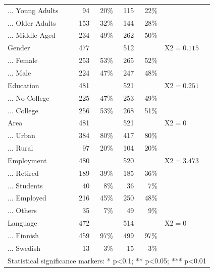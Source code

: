 \begin{table}[!htbp]
\begin{tabular}{lrrrrl}
... Young Adults & 94 & 20\% & 115 & 22\% &  \\ 
... Older Adults & 153 & 32\% & 144 & 28\% &  \\ 
... Middle-Aged & 234 & 49\% & 262 & 50\% &  \\ 
Gender & 477 &  & 512 &  & X2$=0.115$ \\ 
... Female & 253 & 53\% & 265 & 52\% &  \\ 
... Male & 224 & 47\% & 247 & 48\% &  \\ 
Education & 481 &  & 521 &  & X2$=0.251$ \\ 
... No College & 225 & 47\% & 253 & 49\% &  \\ 
... College & 256 & 53\% & 268 & 51\% &  \\ 
Area & 481 &  & 521 &  & X2$=0^{}$ \\ 
... Urban & 384 & 80\% & 417 & 80\% &  \\ 
... Rural & 97 & 20\% & 104 & 20\% &  \\ 
Employment & 480 &  & 520 &  & X2$=3.473$ \\ 
... Retired & 189 & 39\% & 185 & 36\% &  \\ 
... Students & 40 & 8\% & 36 & 7\% &  \\ 
... Employed & 216 & 45\% & 250 & 48\% &  \\ 
... Others & 35 & 7\% & 49 & 9\% &  \\ 
Language & 472 &  & 514 &  & X2$=0^{}$ \\ 
... Finnish & 459 & 97\% & 499 & 97\% &  \\ 
... Swedish & 13 & 3\% & 15 & 3\% & \\ 
\hline
\hline
\multicolumn{6}{l}{Statistical significance markers: * p<0.1; ** p<0.05; *** p<0.01}\\ 
\end{tabular}
\end{table}




